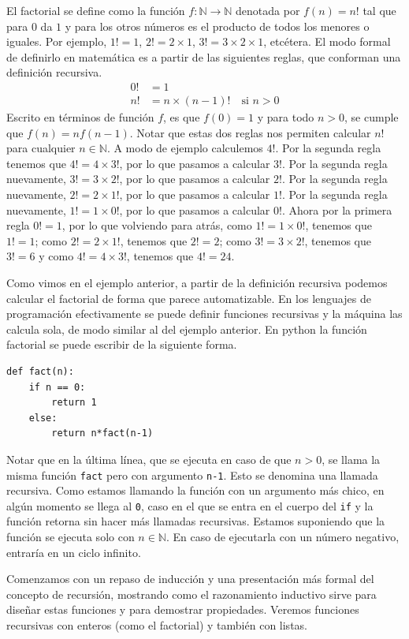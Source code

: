 \documentclass[a4paper, 12pt]{report}
\newcommand{\N}{\mathbb{N}}
\newcommand{\te}{\text}
\theoremstyle{definition}
\begin{document}
El factorial se define como la función $f:\N\to\N$ denotada por $f(n)=n!$ tal que para $0$ da $1$ y para los otros números es el producto de todos los menores o iguales. Por ejemplo, $1!=1$, $2! = 2\times 1$, $3!=3\times 2 \times 1$, etcétera. El modo formal de definirlo en matemática es a partir de las siguientes reglas, que conforman una definición recursiva.
\begin{align*}
	0!&=1\\
	n!&= n\times (n-1)!\quad\te{si }n>0
\end{align*}
Escrito en términos de función $f$, es que $f(0)=1$ y para todo $n>0$, se cumple que $f(n)=nf(n-1)$. Notar que estas dos reglas nos permiten calcular $n!$ para cualquier $n\in\N$. A modo de ejemplo calculemos $4!$. Por la segunda regla tenemos que $4!=4\times 3!$, por lo que pasamos a calcular $3!$. Por la segunda regla nuevamente, $3!=3\times 2!$, por lo que pasamos a calcular $2!$. Por la segunda regla nuevamente, $2!=2\times 1!$, por lo que pasamos a calcular $1!$. Por la segunda regla nuevamente, $1!=1\times 0!$, por lo que pasamos a calcular $0!$. Ahora por la primera regla $0!=1$, por lo que volviendo para atrás, como $1!=1\times 0!$, tenemos que $1! = 1$; como  $2!=2\times 1!$,  tenemos que $2!=2$; como $3!=3\times 2!$, tenemos que $3! = 6$ y como $4!=4\times 3!$, tenemos que $4!=24$.

Como vimos en el ejemplo anterior, a partir de la definición recursiva podemos calcular el factorial de forma que parece automatizable. En los lenguajes de programación efectivamente se puede definir funciones recursivas y la máquina las calcula sola, de modo similar al del ejemplo anterior. En python la función factorial se puede escribir de la siguiente forma.
\begin{verbatim}
def fact(n):
    if n == 0:
        return 1
    else:
        return n*fact(n-1)
\end{verbatim}
Notar que en la última línea, que se ejecuta en caso de que $n>0$, se llama la misma función {\tt fact} pero con argumento {\tt n-1}. Esto se denomina una llamada recursiva. Como estamos llamando la función con un argumento más chico, en algún momento se llega al {\tt 0}, caso en el que se entra en el cuerpo del {\tt if} y la función retorna sin hacer más llamadas recursivas. Estamos suponiendo que la función se ejecuta solo con $n\in\N$. En caso de ejecutarla con un número negativo, entraría en un ciclo infinito.

Comenzamos con un repaso de inducción y una presentación más formal del concepto de recursión, mostrando como el razonamiento inductivo sirve para diseñar estas funciones y para demostrar propiedades. Veremos funciones recursivas con enteros (como el factorial) y también con listas.
\end{document}
